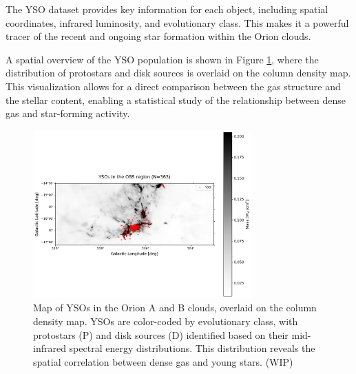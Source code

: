 The YSO dataset provides key information for each object, including spatial coordinates, infrared luminosity, and evolutionary class. This makes it a powerful tracer of the recent and ongoing star formation within the Orion clouds.

A spatial overview of the YSO population is shown in Figure \ref{fig:YSO_map}, where the distribution of protostars and disk sources is overlaid on the column density map. This visualization allows for a direct comparison between the gas structure and the stellar content, enabling a statistical study of the relationship between dense gas and star-forming activity.

\begin{figure}[t]
    \centering
    \includegraphics[width=0.75\textwidth]{figures/YSOs_orion.png}
    \caption{Map of YSOs in the Orion A and B clouds, overlaid on the column density map. YSOs are color-coded by evolutionary class, with protostars (P) and disk sources (D) identified based on their mid-infrared spectral energy distributions. This distribution reveals the spatial correlation between dense gas and young stars. (WIP)}
    \label{fig:YSO_map}
\end{figure}